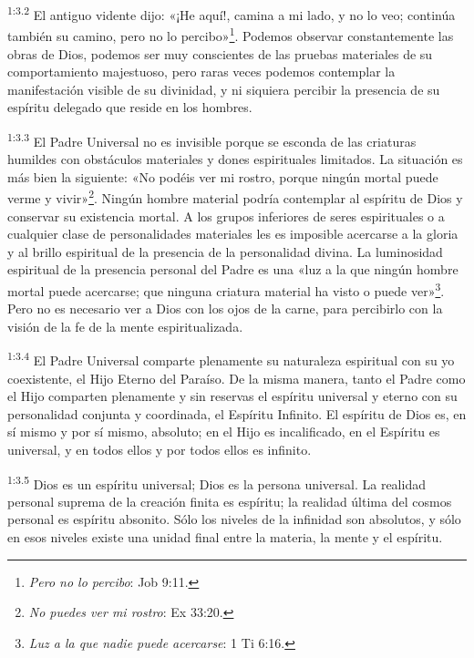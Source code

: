 \par
\textsuperscript{1:3.2} El antiguo vidente dijo: «¡He aquí!, camina a mi lado, y no lo veo; continúa también su camino, pero no lo percibo»\footnote{\textit{Pero no lo percibo}: Job 9:11.}. Podemos observar constantemente las obras de Dios, podemos ser muy conscientes de las pruebas materiales de su comportamiento majestuoso, pero raras veces podemos contemplar la manifestación visible de su divinidad, y ni siquiera percibir la presencia de su espíritu delegado que reside en los hombres.

\par
\textsuperscript{1:3.3} El Padre Universal no es invisible porque se esconda de las criaturas humildes con obstáculos materiales y dones espirituales limitados. La situación es más bien la siguiente: «No podéis ver mi rostro, porque ningún mortal puede verme y vivir»\footnote{\textit{No puedes ver mi rostro}: Ex 33:20.}. Ningún hombre material podría contemplar al espíritu de Dios y conservar su existencia mortal. A los grupos inferiores de seres espirituales o a cualquier clase de personalidades materiales les es imposible acercarse a la gloria y al brillo espiritual de la presencia de la personalidad divina. La luminosidad espiritual de la presencia personal del Padre es una «luz a la que ningún hombre mortal puede acercarse; que ninguna criatura material ha visto o puede ver»\footnote{\textit{Luz a la que nadie puede acercarse}: 1 Ti 6:16.}. Pero no es necesario ver a Dios con los ojos de la carne, para percibirlo con la visión de la fe de la mente espiritualizada.

\par
\textsuperscript{1:3.4} El Padre Universal comparte plenamente su naturaleza espiritual con su yo coexistente, el Hijo Eterno del Paraíso. De la misma manera, tanto el Padre como el Hijo comparten plenamente y sin reservas el espíritu universal y eterno con su personalidad conjunta y coordinada, el Espíritu Infinito. El espíritu de Dios es, en sí mismo y por sí mismo, absoluto; en el Hijo es incalificado, en el Espíritu es universal, y en todos ellos y por todos ellos es infinito.

\par
\textsuperscript{1:3.5} Dios es un espíritu universal; Dios es la persona universal. La realidad personal suprema de la creación finita es espíritu; la realidad última del cosmos personal es espíritu absonito. Sólo los niveles de la infinidad son absolutos, y sólo en esos niveles existe una unidad final entre la materia, la mente y el espíritu.

